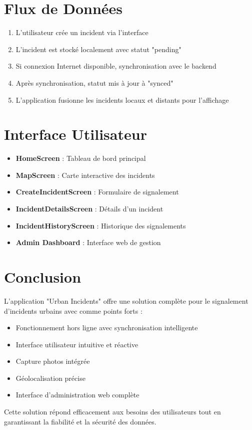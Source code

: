 \documentclass[12pt,a4paper]{article}
\begin{document}
\section*{Flux de Données}

\begin{enumerate}
    \item L'utilisateur crée un incident via l'interface
    \item L'incident est stocké localement avec statut "pending"
    \item Si connexion Internet disponible, synchronisation avec le backend
    \item Après synchronisation, statut mis à jour à "synced"
    \item L'application fusionne les incidents locaux et distants pour l'affichage
\end{enumerate}

\section*{Interface Utilisateur}

\begin{itemize}
    \item \textbf{HomeScreen} : Tableau de bord principal
    \item \textbf{MapScreen} : Carte interactive des incidents
    \item \textbf{CreateIncidentScreen} : Formulaire de signalement
    \item \textbf{IncidentDetailsScreen} : Détails d'un incident
    \item \textbf{IncidentHistoryScreen} : Historique des signalements
    \item \textbf{Admin Dashboard} : Interface web de gestion
\end{itemize}

\section*{Conclusion}

L'application "Urban Incidents" offre une solution complète pour le signalement d'incidents urbains avec comme points forts :
\begin{itemize}
    \item Fonctionnement hors ligne avec synchronisation intelligente
    \item Interface utilisateur intuitive et réactive
    \item Capture photos intégrée
    \item Géolocalisation précise
    \item Interface d'administration web complète
\end{itemize}

Cette solution répond efficacement aux besoins des utilisateurs tout en garantissant la fiabilité et la sécurité des données.
\end{document}
